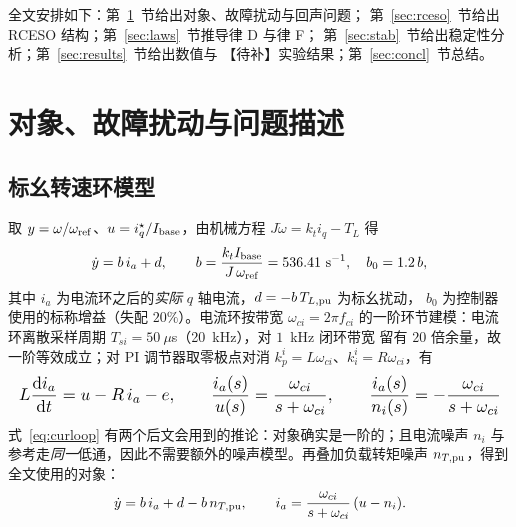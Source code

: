 \documentclass[journal]{IEEEtran}
\theoremstyle{remark}
\begin{document}
全文安排如下：第~\ref{sec:plant}~节给出对象、故障扰动与回声问题；
第~\ref{sec:rceso}~节给出 RCESO 结构；第~\ref{sec:laws}~节推导律 D 与律 F；
第~\ref{sec:stab}~节给出稳定性分析；第~\ref{sec:results}~节给出数值与
【待补】实验结果；第~\ref{sec:concl}~节总结。

\section{对象、故障扰动与问题描述}\label{sec:plant}

\subsection{标幺转速环模型}
取 $y=\omega/\omega_{\rm ref}$、$u=i_q^\star/I_{\rm base}$，由机械方程
$J\dot\omega=k_t i_q-T_L$ 得
\begin{equation}
\dot y=b\,i_a+d,\qquad
b=\frac{k_t I_{\rm base}}{J\,\omega_{\rm ref}}=536.41~\mathrm{s^{-1}},
\quad b_0=1.2\,b ,
\label{eq:obj}
\end{equation}
其中 $i_a$ 为电流环之后的\emph{实际} $q$ 轴电流，$d=-b\,T_{L,\rm pu}$ 为标幺扰动，
$b_0$ 为控制器使用的标称增益（失配 $20\%$）。电流环按带宽 $\omega_{ci}=2\pi f_{ci}$
的一阶环节建模：电流环离散采样周期 $T_{si}=50~\mu$s（20~kHz），对 $1$~kHz 闭环带宽
留有 $20$ 倍余量，故一阶等效成立；对 PI 调节器取零极点对消
$k_p^i=L\omega_{ci}$、$k_i^i=R\omega_{ci}$，有
\begin{equation}
\resizebox{\columnwidth}{!}{$\displaystyle
L\frac{\mathrm d i_a}{\mathrm dt}=u-R\,i_a-e,\qquad
\frac{i_a(s)}{u(s)}=\frac{\omega_{ci}}{s+\omega_{ci}},\qquad
\frac{i_a(s)}{n_i(s)}=-\frac{\omega_{ci}}{s+\omega_{ci}}$}
\label{eq:curloop}
\end{equation}
式~\eqref{eq:curloop} 有两个后文会用到的推论：对象确实是一阶的；且电流噪声 $n_i$
与参考走\emph{同一}低通，因此不需要额外的噪声模型。再叠加负载转矩噪声
$n_{T,\rm pu}$，得到全文使用的对象：
\begin{equation}
\dot y=b\,i_a+d-b\,n_{T,\rm pu},\qquad
i_a=\frac{\omega_{ci}}{s+\omega_{ci}}\,(u-n_i).
\label{eq:plant}
\end{equation}
\end{document}
